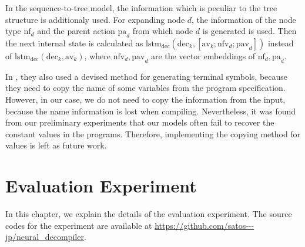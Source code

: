 \documentclass[11pt]{jarticle}
\begin{document}

In the sequence-to-tree model, the information which is peculiar to the tree structure is additionaly used.
For expanding node $d$, the information of the node type $ \mathrm{nf}_{d} $ and the parent action $\mathrm{pa}_{d}$ from which node $d$ is generated is used.
Then the next internal state is calculated as $ \mathrm{lstm}_{\mathrm{dec}}(\mathrm{dec}_{k},[\mathrm{av}_{k}; \mathrm{nfv}_{d}; \mathrm{pav}_{d}]) $ instead of $ \mathrm{lstm}_{\mathrm{dec}}(\mathrm{dec}_{k},\mathrm{av}_{k}) $, 
where $\mathrm{nfv}_{d},\mathrm{pav}_{d}$ are the vector embeddings of $\mathrm{nf}_{d},\mathrm{pa}_{d}$.

In \citet{Seq2Tree}, they also used a devised method for generating terminal symbols, because they need to copy the name of some variables from the program specification.
However, in our case, we do not need to copy the information from the input, because the name information is lost when compiling.
Nevertheless, it was found from our preliminary experiments that our models often fail to recover the constant values in the programs.
Therefore, implementing the copying method for values is left as future work.



\chapter{Evaluation Experiment}
In this chapter, we explain the details of the evaluation experiment.
The source codes for the experiment are available at \url{https://github.com/satos---jp/neural_decompiler}.  
\end{document}
